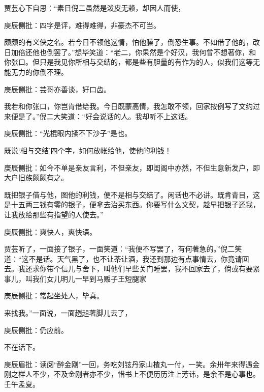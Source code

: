 \begin{parag}


    贾芸心下自思：“素日倪二虽然是泼皮无赖，却因人而使，\begin{note}庚辰侧批：四字是评，难得难得，非豪杰不可当。\end{note}颇颇的有义侠之名。若今日不领他这情，怕他臊了，倒恐生事。不如借了他的，改日加倍还他也倒罢了。”想毕笑道：“老二，你果然是个好汉，我何曾不想著你，和你张口。但只是我见你所相与交结的，都是些有胆量的有作为的人，似我们这等无能无力的你倒不理。\begin{note}庚辰侧批：芸哥亦善谈，好口齿。\end{note}我若和你张口，你岂肯借给我。今日既蒙高情，我怎敢不领，回家按例写了文约过来便是了。”倪二大笑道：“好会说话的人。我却听不上这话。\begin{note}庚辰侧批：“光棍眼内揉不下沙子”是也。\end{note}既说‘相与交结’四个字，如何放帐给他，使他的利钱！\begin{note}庚辰侧批：如今不单是亲友言利，不但亲友，即闺阁中亦然，不但生意新发户，即大户旧族颇颇有之。\end{note}既把银子借与他，图他的利钱，便不是相与交结了。闲话也不必讲。既肯青目，这是十五两三钱有零的银子，便拿去治买东西。你要写什么文契，趁早把银子还我，让我放给那些有指望的人使去。”\begin{note}庚辰侧批：爽快人，爽快语。\end{note}贾芸听了，一面接了银子，一面笑道：“我便不写罢了，有何著急的。”倪二笑道：“这不是话。天气黑了，也不让茶让酒，我还到那边有点事情去，你竟请回去。我还求你带个信儿与舍下，叫他们早些关门睡罢，我不回家去了，倘或有要紧事儿，叫我们女儿明儿一早到马贩子王短腿家\begin{note}庚辰侧批：常起坐处人，毕真。\end{note}来找我。”一面说，一面趔趄著脚儿去了，\begin{note}庚辰侧批：仍应前。\end{note}不在话下。\begin{note}庚辰眉批：读阅“醉金刚”一回，务吃刘铉丹家山楂丸一付，一笑。余卅年来得遇金刚之样人不少，不及金刚者亦不少，惜书上不便历历注上芳讳，是余不是心事也。壬午孟夏。\end{note}
\end{parag}


